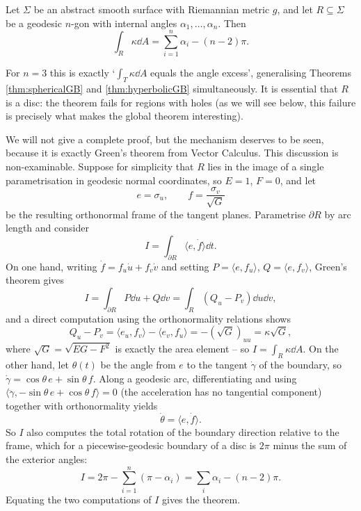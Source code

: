 \begin{theorem}\label{thm:localGB}
    Let $\Sigma$ be an abstract smooth surface with Riemannian metric $g$, and let $R \subseteq \Sigma$ be a geodesic $n$-gon with internal angles $\alpha_1, \dots, \alpha_n$. Then
    $$
    \int_R \kappa \dd A = \sum_{i=1}^n \alpha_i - (n - 2)\pi.
    $$
\end{theorem}

For $n = 3$ this is exactly `$\int_T \kappa \dd A$ equals the angle excess', generalising Theorems \ref{thm:sphericalGB} and \ref{thm:hyperbolicGB} simultaneously. It is essential that $R$ is a disc: the theorem fails for regions with holes (as we will see below, this failure is precisely what makes the global theorem interesting).

We will not give a complete proof, but the mechanism deserves to be seen, because it is exactly Green's theorem from Vector Calculus. This discussion is non-examinable. Suppose for simplicity that $R$ lies in the image of a single parametrisation in geodesic normal coordinates, so $E = 1$, $F = 0$, and let
$$
e = \sigma_u, \qquad f = \frac{\sigma_v}{\sqrt{G}}
$$
be the resulting orthonormal frame of the tangent planes. Parametrise $\partial R$ by arc length and consider
$$
I = \int_{\partial R} \langle e, \dot f \rangle \dd t.
$$
On one hand, writing $\dot f = f_u \dot u + f_v \dot v$ and setting $P = \langle e, f_u \rangle$, $Q = \langle e, f_v \rangle$, Green's theorem gives
$$
I = \int_{\partial R} P \dd u + Q \dd v = \int_R (Q_u - P_v) \dd u \dd v,
$$
and a direct computation using the orthonormality relations shows
$$
Q_u - P_v = \langle e_u, f_v \rangle - \langle e_v, f_u \rangle = -(\sqrt{G})_{uu} = \kappa \sqrt{G},
$$
where $\sqrt{G} = \sqrt{EG - F^2}$ is exactly the area element -- so $I = \int_R \kappa \dd A$.
On the other hand, let $\theta(t)$ be the angle from $e$ to the tangent $\dot\gamma$ of the boundary, so $\dot\gamma = \cos\theta\, e + \sin\theta \, f$. Along a geodesic arc, differentiating and using $\langle \ddot\gamma, -\sin\theta \, e + \cos\theta\, f \rangle = 0$ (the acceleration has no tangential component) together with orthonormality yields
$$
\dot\theta = \langle e, \dot f\rangle.
$$
So $I$ also computes the total rotation of the boundary direction relative to the frame, which for a piecewise-geodesic boundary of a disc is $2\pi$ minus the sum of the exterior angles:
$$
I = 2\pi - \sum_{i=1}^n (\pi - \alpha_i) = \sum_i \alpha_i - (n - 2)\pi.
$$
Equating the two computations of $I$ gives the theorem.

